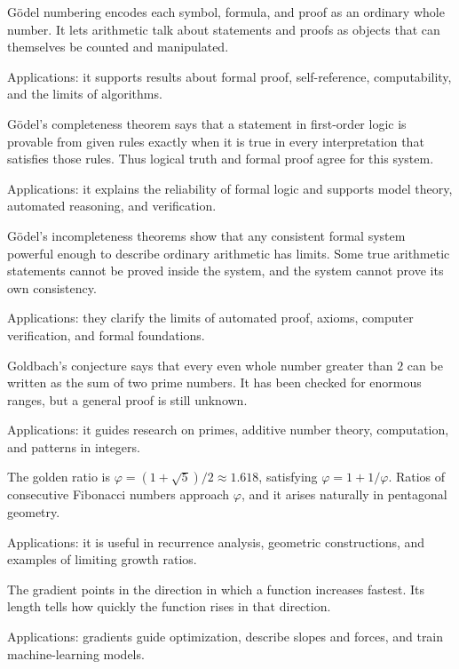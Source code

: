 Gödel numbering encodes each symbol, formula, and proof as an ordinary whole number. It lets arithmetic talk about statements and proofs as objects that can themselves be counted and manipulated. \par\noindent Applications: it supports results about formal proof, self-reference, computability, and the limits of algorithms.

Gödel's completeness theorem says that a statement in first-order logic is provable from given rules exactly when it is true in every interpretation that satisfies those rules. Thus logical truth and formal proof agree for this system. \par\noindent Applications: it explains the reliability of formal logic and supports model theory, automated reasoning, and verification.

Gödel's incompleteness theorems show that any consistent formal system powerful enough to describe ordinary arithmetic has limits. Some true arithmetic statements cannot be proved inside the system, and the system cannot prove its own consistency. \par\noindent Applications: they clarify the limits of automated proof, axioms, computer verification, and formal foundations.

Goldbach's conjecture says that every even whole number greater than $2$ can be written as the sum of two prime numbers. It has been checked for enormous ranges, but a general proof is still unknown. \par\noindent Applications: it guides research on primes, additive number theory, computation, and patterns in integers.

The golden ratio is $\varphi=(1+\sqrt5)/2\approx1.618$, satisfying $\varphi=1+1/\varphi$. Ratios of consecutive Fibonacci numbers approach $\varphi$, and it arises naturally in pentagonal geometry. \par\noindent Applications: it is useful in recurrence analysis, geometric constructions, and examples of limiting growth ratios.

The gradient points in the direction in which a function increases fastest. Its length tells how quickly the function rises in that direction. \par\noindent Applications: gradients guide optimization, describe slopes and forces, and train machine-learning models.

